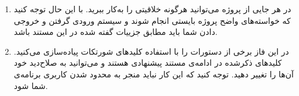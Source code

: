 \begin{enumerate}[label={نکته \arabic*:}]
\item
در هر جایی از پروژه می‌توانید هرگونه خلاقیتی را به‌کار ببرید. با این حال توجه کنید که خواسته‌های واضح پروژه بایستی انجام شوند و سیستم ورودی گرفتن و خروجی دادن شما باید مطابق جزییات گفته شده در این مستند باشد.


\item در این فاز برخی از دستورات را با استفاده کلیدهای شورتکات پیاده‌سازی می‌کنید. کلیدهای ذکرشده در ادامه‌ی مستند پیشنهادی هستند و می‌توانید به صلاح‌دید خود آن‌ها را تغییر دهید. توجه کنید که این کار نباید منجر به محدود شدن کاربری برنامه‌ی شما شود.

	
	
		
		
	

	
	
		
		
	


\end{enumerate}
